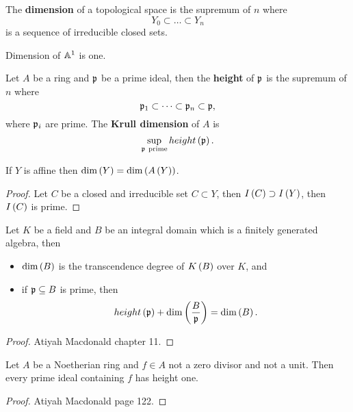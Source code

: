 \begin{definition}
The \textbf{dimension} of a topological space is the supremum of $ n $ where
$$ Y_0 \subset \dots \subset Y_n $$
is a sequence of irreducible closed sets.
\end{definition}

\begin{example}
Dimension of $ \mathbb{A}^1 $ is one.
\end{example}

\begin{definition}
Let $ A $ be a ring and $ \mathfrak{p} $ be a prime ideal, then the \textbf{height} of $ \mathfrak{p} $ is the supremum of $ n $ where
$$ \mathfrak{p}_1 \subset \dots \subset \mathfrak{p}_n \subset \mathfrak{p}, $$
where $ \mathfrak{p}_i $ are prime. The \textbf{Krull dimension} of $ A $ is
$$ \sup_{\mathfrak{p} \ \text{prime}} height\left( \mathfrak{p} \right). $$
\end{definition}

\begin{proposition}
If $ Y $ is affine then $ \dim\left( Y \right) = \dim\left( A\left( Y \right) \right) $.
\end{proposition}

\begin{proof}
Let $ C $ be a closed and irreducible set $ C \subset Y $, then $ I\left( C \right) \supset I\left( Y \right) $, then $ I\left( C \right) $ is prime.
\end{proof}

\begin{proposition}
Let $ K $ be a field and $ B $ be an integral domain which is a finitely generated algebra, then
\begin{itemize}
\item $ \dim\left( B \right) $ is the transcendence degree of $ K\left( B \right) $ over $ K $, and
\item if $ \mathfrak{p} \subseteq B $ is prime, then
$$ height\left( \mathfrak{p} \right) + \dim\left( \dfrac{B}{\mathfrak{p}} \right) = \dim\left( B \right). $$
\end{itemize}
\end{proposition}

\begin{proof}
Atiyah Macdonald chapter 11.
\end{proof}

\begin{proposition}
Let $ A $ be a Noetherian ring and $ f \in A $ not a zero divisor and not a unit. Then every prime ideal containing $ f $ has height one.
\end{proposition}

\begin{proof}
Atiyah Macdonald page 122.
\end{proof}

